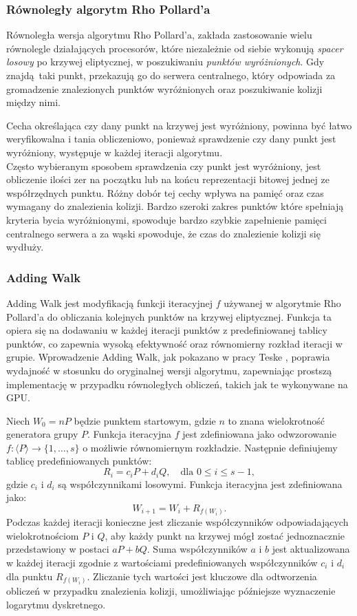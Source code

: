 \subsubsection{Równoległy algorytm Rho Pollard'a}
Równoległa wersja algorytmu Rho Pollard'a, zakłada zastosowanie wielu równolegle działających
procesorów, które niezależnie od siebie wykonują \textit{spacer losowy} po krzywej eliptycznej,
w poszukiwaniu \textit{punktów wyróżnionych}. Gdy znajdą taki punkt, przekazują go do serwera centralnego,
który odpowiada za gromadzenie znalezionych punktów wyróżnionych oraz poszukiwanie kolizji między nimi.
\par
Cecha określająca czy dany punkt na krzywej jest wyróżniony, powinna być łatwo weryfikowalna i tania obliczeniowo,
ponieważ sprawdzenie czy dany punkt jest wyróżniony, występuje w każdej iteracji algorytmu. \\
Często wybieranym sposobem sprawdzenia czy punkt jest wyróżniony, jest obliczenie ilości zer na początku lub na końcu
reprezentacji bitowej jednej ze współrzędnych punktu. Różny dobór tej cechy wpływa na pamięć oraz
czas wymagany do znalezienia kolizji. Bardzo szeroki zakres punktów które spełniają kryteria bycia wyróżnionymi,
spowoduje bardzo szybkie zapełnienie pamięci centralnego serwera a za wąski spowoduje, że czas do znalezienie kolizji się wydłuży.

\subsubsection{Adding Walk}

Adding Walk jest modyfikacją funkcji iteracyjnej $f$ używanej w algorytmie Rho Pollard’a 
do obliczania kolejnych punktów na krzywej eliptycznej. Funkcja ta opiera się 
na dodawaniu w każdej iteracji punktów z predefiniowanej tablicy punktów, co 
zapewnia wysoką efektywność oraz równomierny rozkład iteracji w grupie. Wprowadzenie 
Adding Walk, jak pokazano w pracy Teske \cite{Teske2000}, poprawia wydajność w 
stosunku do oryginalnej wersji algorytmu, zapewniając prostszą implementację w 
przypadku równoległych obliczeń, takich jak te wykonywane na GPU.

Niech $W_0 = nP$ będzie punktem startowym, gdzie $n$ to znana wielokrotność 
generatora grupy $P$. Funkcja iteracyjna $f$ jest zdefiniowana jako odwzorowanie 
$f: \langle P \rangle \rightarrow \{1, \ldots, s\}$ o możliwie równomiernym 
rozkładzie. Następnie definiujemy tablicę predefiniowanych punktów:
$$
R_i = c_i P + d_i Q, \quad \text{dla } 0 \leq i \leq s - 1,
$$
gdzie $c_i$ i $d_i$ są współczynnikami losowymi. Funkcja iteracyjna jest zdefiniowana 
jako:
$$
W_{i+1} = W_i + R_{f(W_i)}.
$$
Podczas każdej iteracji konieczne jest zliczanie współczynników odpowiadających 
wielokrotnościom $P$ i $Q$, aby każdy punkt na krzywej mógł zostać jednoznacznie 
przedstawiony w postaci $aP + bQ$. Suma współczynników $a$ i $b$ jest aktualizowana 
w każdej iteracji zgodnie z wartościami predefiniowanych współczynników 
$c_i$ i $d_i$ dla punktu $R_{f(W_i)}$. Zliczanie tych wartości jest kluczowe 
dla odtworzenia obliczeń w przypadku znalezienia kolizji, umożliwiając późniejsze 
wyznaczenie logarytmu dyskretnego.

